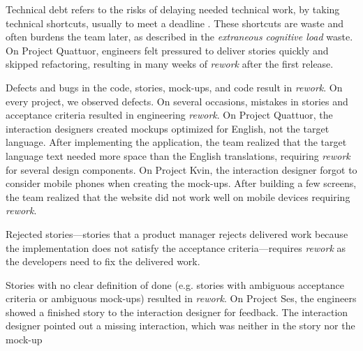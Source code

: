 Technical debt refers to the risks of delaying needed technical work, by taking technical shortcuts, usually to meet a deadline \cite{McConnellTechnicalDebt}. These shortcuts are waste and often burdens the team later, as described in the \textit{extraneous cognitive load} waste. On Project Quattuor, engineers felt pressured to deliver stories quickly and skipped refactoring, resulting in many weeks of \textit{rework} after the first release. 

Defects and bugs in the code, stories, mock-ups, and code result in \textit{rework}. On every project, we observed defects. On several occasions, mistakes in stories and acceptance criteria resulted in engineering \textit{rework}. On Project Quattuor, the interaction designers created mockups optimized for English, not the target language. After implementing the application, the team realized that the target language text needed more space than the English translations, requiring \textit{rework} for several design components. On Project Kvin, the interaction designer forgot to consider mobile phones when creating the mock-ups. After building a few screens, the team realized that the website did not work well on mobile devices requiring \textit{rework}.


Rejected stories---stories that a product manager rejects delivered work because the implementation does not satisfy the acceptance criteria---requires \textit{rework} as the developers need to fix the delivered work.

Stories with no clear definition of done (e.g. stories with ambiguous acceptance criteria or ambiguous mock-ups) resulted in \textit{rework}. On Project Ses, the engineers showed a finished story to the interaction designer for feedback. The interaction designer pointed out a missing interaction, which was neither in the story nor the mock-up

